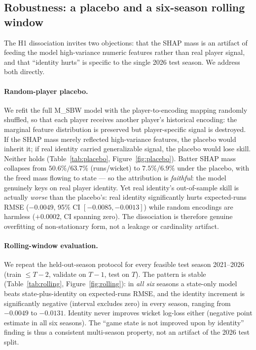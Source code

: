 \subsection{Robustness: a placebo and a six-season rolling window}
\label{sec:results-robust}
The H1 dissociation invites two objections: that the SHAP mass is an artifact of
feeding the model high-variance numeric features rather than real player signal,
and that ``identity hurts'' is specific to the single 2026 test season. We address
both directly.

\paragraph{Random-player placebo.}
We refit the full M\_SBW model with the player-to-encoding mapping randomly
shuffled, so that each player receives another player's historical encoding: the
marginal feature distribution is preserved but player-specific signal is destroyed.
If the SHAP mass merely reflected high-variance features, the placebo would inherit
it; if real identity carried generalizable signal, the placebo would lose skill.
Neither holds (Table~\ref{tab:placebo}, Figure~\ref{fig:placebo}). Batter SHAP mass
collapses from $50.6\%/63.7\%$ (runs/wicket) to $7.5\%/6.9\%$ under the placebo,
with the freed mass flowing to state --- so the attribution is \emph{faithful}: the
model genuinely keys on real player identity. Yet real identity's out-of-sample
skill is actually \emph{worse} than the placebo's: real identity significantly hurts
expected-runs RMSE ($-0.0049$, 95\% CI $[-0.0085, -0.0013]$) while random encodings
are harmless ($+0.0002$, CI spanning zero). The dissociation is therefore genuine
overfitting of non-stationary form, not a leakage or cardinality artifact.

\paragraph{Rolling-window evaluation.}
We repeat the held-out-season protocol for every feasible test season 2021--2026
(train $\le T{-}2$, validate on $T{-}1$, test on $T$). The pattern is stable
(Table~\ref{tab:rolling}, Figure~\ref{fig:rolling}): in \emph{all six} seasons a
state-only model beats state-plus-identity on expected-runs RMSE, and the identity
increment is significantly negative (interval excludes zero) in every season,
ranging from $-0.0049$ to $-0.0131$. Identity never improves wicket log-loss either
(negative point estimate in all six seasons). The ``game state is not improved upon
by identity'' finding is thus a consistent multi-season property, not an artifact of
the 2026 test split.

